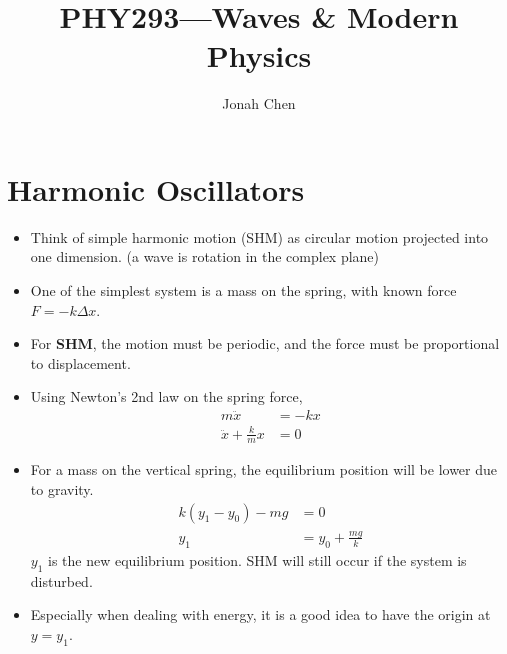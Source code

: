 \documentclass[a4paper]{article}
\title{PHY293---Waves \& Modern Physics}
\author{Jonah Chen}
\numberwithin{equation}{section}
\begin{document}
\maketitle
\tableofcontents
\section{Harmonic Oscillators}

\begin{itemize}
    \item Think of simple harmonic motion (SHM) as circular motion projected into one dimension. (a wave is rotation in the complex plane)
    \item One of the simplest system is a mass on the spring, with known force $F=-k\Delta x$. 
    \item For \textbf{SHM}, the motion must be periodic, and the force must be proportional to displacement.
    \item Using Newton's 2nd law on the spring force,
    \begin{align}
        m\ddot x &= -kx\\
        \ddot x + \frac{k}{m} x &= 0\label{12}
    \end{align}
    \item For a mass on the vertical spring, the equilibrium position will be lower due to gravity. 
    \begin{align}
        k(y_1-y_0)-mg&=0\\
        y_1&=y_0+\frac{mg}{k}
    \end{align}
    $y_1$ is the new equilibrium position. SHM will still occur if the system is disturbed. 
    \item Especially when dealing with energy, it is a good idea to have the origin at $y=y_1$.
\end{itemize}
\end{document}
